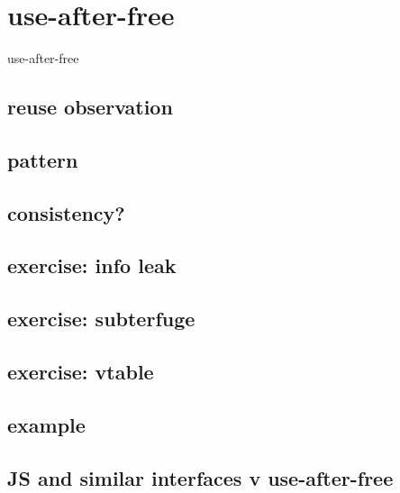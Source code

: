 \section{use-after-free}
\begin{frame}{use-after-free}
\end{frame}



\subsection{reuse observation}


\subsection{pattern}


\subsection{consistency?}


\subsection{exercise: info leak}


\subsection{exercise: subterfuge}


\subsection{exercise: vtable}


\subsection{example}


\subsection{JS and similar interfaces v use-after-free}


